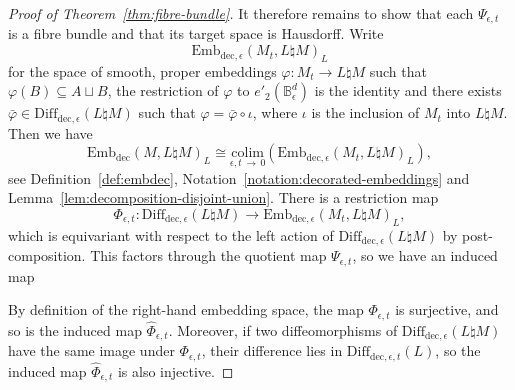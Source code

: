 \documentclass[AHL,Unicode,published]{cedram}
\newcommand{\colim}{\mathrm{colim}}
\newcommand{\rdec}{\mathrm{dec}}
\newcommand{\bB}{\mathbb{B}}
\newcommand{\too}{\ensuremath{\longrightarrow}}
\newcommand{\diffdece}{\ensuremath{\mathrm{Diff}_{\rdec,\epsilon}}}
\newcommand{\diffdecet}{\ensuremath{\mathrm{Diff}_{\rdec,\epsilon,t}}}
\newcommand{\embdec}{\ensuremath{\mathrm{Emb}_{\rdec}}}
\newcommand{\embdece}{\ensuremath{\mathrm{Emb}_{\rdec,\epsilon}}}
\begin{document}
\begin{proof}[Proof of Theorem~\ref{thm:fibre-bundle}]
It therefore remains to show that each $\Psi_{\epsilon,t}$ is a fibre bundle and that its target space is Hausdorff. Write
\[
\embdece(M_t,L\natural M)_L
\]
for the space of smooth, proper embeddings $\varphi \colon M_t \to L \natural M$ such that $\varphi(B) \subseteq A \sqcup B$, the restriction of $\varphi$ to $e'_{2}(\bB_{\epsilon}^d)$ is the identity and there exists $\bar{\varphi} \in \diffdece(L \natural M)$ such that $\varphi = \bar{\varphi} \circ \iota$, where $\iota$ is the inclusion of $M_t$ into $L\natural M$. Then we have
\begin{equation}\label{eq:emb-colimit-identification}
\embdec(M,L\natural M)_L \cong \underset{\epsilon,t\,\to\,0}{\colim} \left(\embdece(M_t,L\natural M)_L\right),
\end{equation}
see Definition~\ref{def:embdec}, Notation~\ref{notation:decorated-embeddings} and Lemma~\ref{lem:decomposition-disjoint-union}. There is a restriction map
\[
\Phi_{\epsilon,t} \colon \diffdece(L\natural M) \too \embdece(M_t,L\natural M)_L,
\]
which is equivariant with respect to the left action of $\diffdece(L\natural M)$ by post-composi\-tion. This factors through the quotient map $\Psi_{\epsilon,t}$, so we have an induced map
\begin{center}
\end{center}
By definition of the right-hand embedding space, the map $\Phi_{\epsilon,t}$ is surjective, and so is the induced map $\widehat{\Phi}_{\epsilon,t}$. Moreover, if two diffeomorphisms of $\diffdece(L\natural M)$ have the same image under $\Phi_{\epsilon,t}$, their difference lies in $\diffdecet(L)$, so the induced map $\widehat{\Phi}_{\epsilon,t}$ is also injective.


\end{proof}
\end{document}
